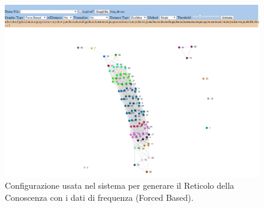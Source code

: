\noindent
\begin{figure}[H]
\centering
	\includegraphics[width=1\linewidth]{./image/Reticolo_db -frequenza-3.png}
	\caption{Configurazione usata nel sistema per generare il Reticolo della Conoscenza con i dati di frequenza (Forced Based).}
	\label{Configurazione usata nel sistema per generare il Reticolo della Conoscenza con i dati di frequenza (Forced Based).}
\end{figure}
\noindent




